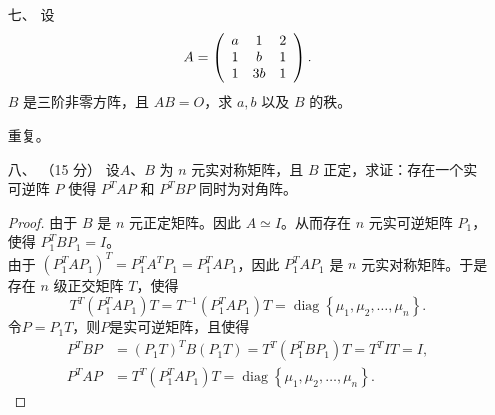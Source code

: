 \begin{enumerate}[1~]
\begin{proof}
当 $i = 2$ 时， \eqref{bikbki} 式成为
\begin{equation*}
\sum_{k = 1}^n b_{2k}^2 = b_{12}^2 + b_{22}^2 = b_{22}^2.
\end{equation*}
由此推出，$b_{23} = b_{24} = \cdots = b_{2n} = 0$。

依次下去，可得\[
b_{34} = \cdots = b_{3n} = 0, \dots , b_{n-1, n} = 0.
\]
因此 $B$ 是对角矩阵。由于 $A$ 正交相似于对角矩阵 $B$，因此 $A$ 是对称矩阵。
\end{proof}

\item[七、]
设\[
A = \left( \begin{array} { c c c } { a } & { 1 } & { 2 } \\ { 1 } & { b } & { 1 } \\ { 1 } & { 3 b } & { 1 } \end{array} \right).
\]
$B$ 是三阶非零方阵，且 $AB = O$，求 $a, b$ 以及 $B$ 的秩。
\begin{solution}
重复。
\end{solution}
\item[八、]（15 分）
设$A、B$ 为 $n$ 元实对称矩阵，且 $B$ 正定，求证：存在一个实可逆阵 $P$ 使得 $P^TAP$ 和 $P^TBP$ 同时为对角阵。
\begin{proof}
由于 $B$ 是 $n$ 元正定矩阵。因此 $A \simeq I$。从而存在 $n$ 元实可逆矩阵 $P_1$，使得 $P_1^TBP_1 = I$。\\
由于 $(P_1^T AP_1)^T = P_1^T A^T P_1 = P_1^T AP_1$，因此 $P_1^T AP_1$ 是 $n$ 元实对称矩阵。于是存在 $n$ 级正交矩阵 $T$，使得\[
T ^ T \left( P _ { 1 } ^ T A P _ { 1 } \right) T = T ^ { - 1 } \left( P _ { 1 } ^ T A P _ { 1 } \right) T = \operatorname { diag } \left\{ \mu _ { 1 } , \mu _ { 2 } , \dots , \mu _ { n } \right\}.
\]
令$P=P_1 T$，则$P$是实可逆矩阵，且使得\begin{align*}
P ^ T B P &= \left( P _ { 1 } T \right) ^ T B \left( P _ { 1 } T \right) = T ^ T \left( P _ { 1 } ^ T B P _ { 1 } \right) T = T ^ T I T = I,\\
P ^ T A P &= T ^ T \left( P _ { 1 } ^ T A P _ { 1 } \right) T = \operatorname { diag } \left\{ \mu _ { 1 } , \mu _ { 2 } , \dots , \mu _ { n } \right\}.
\end{align*}
\end{proof}

\end{enumerate}
\endinput